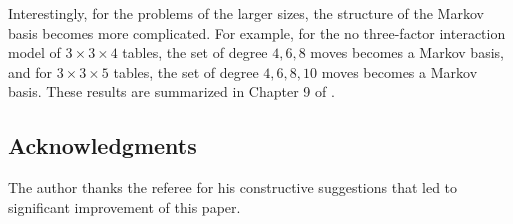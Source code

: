 \documentclass[12pt]{article}
\theoremstyle{definition}
\begin{document}
Interestingly, for the problems of the larger sizes, the structure of
the Markov basis becomes more complicated. For example, for the no
three-factor interaction model of $3\times 3\times 4$ tables, the set of
degree $4, 6, 8$ moves becomes a Markov basis, and for 
$3\times 3\times 5$ tables, the set of 
degree $4, 6, 8, 10$ moves becomes a Markov basis. These results are
summarized in Chapter 9 of \cite{Aoki-Hara-Takemura-2012}.

\subsection*{Acknowledgments}
The author thanks the referee for his constructive suggestions that led
to significant improvement of this paper. 



\end{document}
